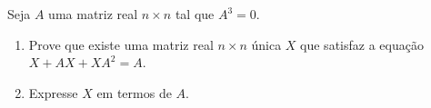 Seja \(A\) uma matriz real \(n\times n\) tal que \(A^3=0\).
\begin{enumerate}[label = (\alph*)]
	\item Prove que existe uma matriz real \(n\times n\) única \(X\) que satisfaz a equação \(X+AX+XA^2=A\).
	\item Expresse \(X\) em termos de \(A\).
\end{enumerate}
